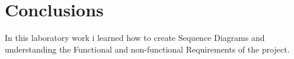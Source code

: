 \section*{Conclusions}
In this laboratory work i learned how to create Sequence Diagrams and understanding the Functional and non-functional Requirements of the project.
\clearpage